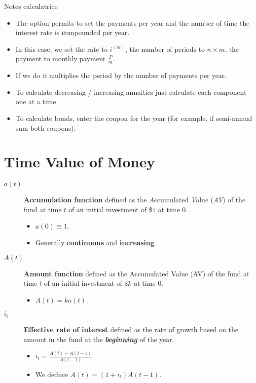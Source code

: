 \documentclass[10pt, french]{article}
\def\SectionColor{cobalt}
\begin{document}
%

\raggedcolumns
\begin{multicols*}{2}

Notes calculatrice
\begin{itemize}
	\item	The option  permits to set the payments per year and  the number of time the interest rate is \textbf{c}ompounded per year.
	\item	In this case, we set the rate to $i^{(m)}$, the number of periods to $n \times m$, the payment to monthly payment $\frac{P}{m}$.
	\item	If we do   it multiplies the period by the number of payments per year.
	\item	To calculate decreasing / increasing annuities just calculate each component one at a time.
	\item	To calculate bonds, enter the coupon for the year (for example, if semi-annual sum both coupons).
\end{itemize}


\def\SectionColor{red!80!white}
\section{Time Value of Money}
\begin{distributions}
\begin{description}
	\item[$a(t)$]	\textbf{Accumulation function} defined as the \textit{A}ccumulated \textit{V}alue (\textit{AV}) of the fund at time $t$ of an initial investment of $\$1$ at time 0.
		\begin{itemize}
		\item	$a(0) \equiv 1$.
		\item	Generally \textbf{continuous} and \textbf{increasing}.
		\end{itemize}
	\item[$A(t)$]	\textbf{Amount function} defined as the Accumulated Value (AV) of the fund at time $t$ of an initial investment of $\$k$ at time 0.
		\begin{itemize}[leftmargin = *]
		\item	$A(t) = k a(t)$.
		\end{itemize}
	\item[$i_{t}$]	\textbf{Effective rate of interest} defined as the rate of growth based on the amount in the fund at the \textbf{\textit{beginning}} of the year.
		\begin{itemize}[leftmargin = *]
		\item	$i_{t} = \frac{A(t) - A(t - 1)}{A(t - 1)}$.
		\item	We deduce $A(t) = (1 + i_{t})A(t - 1)$.
		\end{itemize}
\end{description}
\end{distributions}


\end{multicols*}
\end{document}
